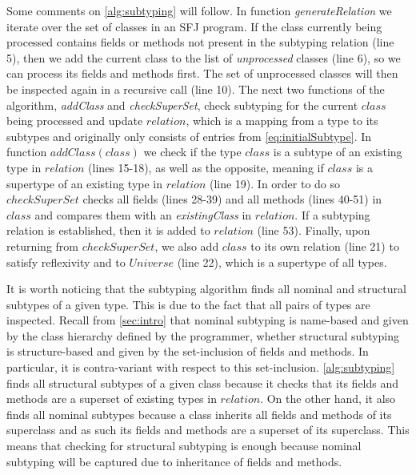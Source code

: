 \documentclass[runningheads]{llncs}
\begin{document}
Some comments on \autoref{alg:subtyping} will follow.
In function \textit{generateRelation} we iterate over the set of classes in an SFJ program.
If the class currently being processed contains fields or methods not present in the subtyping relation (line 5), then we add the current class to the list of \emph{unprocessed} classes (line 6), so we can process its fields and methods first.
The set of unprocessed classes will then be inspected again in a recursive call (line 10).
The next two functions of the algorithm, \emph{addClass} and \emph{checkSuperSet}, check subtyping for the current $class$ being processed and update $relation$, which is a mapping from a type to its subtypes and originally only consists of entries from \autoref{eq:initialSubtype}.
In function $addClass(class)$ we check if the type $class$ is a subtype of an existing type in $relation$ (lines 15-18), as well as the opposite, meaning if $class$ is a supertype of an existing type in $relation$ (line 19). In order to do so $checkSuperSet$ checks all fields (lines 28-39) and all methods (lines 40-51) in $class$ and compares them with an \emph{existingClass} in $relation$. If a subtyping relation is established, then it is added to $relation$ (line 53).
Finally, upon returning from $checkSuperSet$, we also add $class$ to its own relation (line 21) to satisfy reflexivity and to $Universe$ (line 22), which is a supertype of all types.

It is worth noticing that the subtyping algorithm finds all nominal and structural subtypes of a given type. This is due to the fact that all pairs of types are inspected.
Recall from \autoref{sec:intro} that nominal subtyping is name-based and given by the class hierarchy defined by the programmer, whether structural subtyping is structure-based and given by the set-inclusion of fields and methods. In particular, it is contra-variant with respect to this set-inclusion.
\autoref{alg:subtyping} finds all structural subtypes of a given class because it checks that its fields and methods are a superset of existing types in $relation$.
On the other hand, it also finds all nominal subtypes because a class inherits all fields and methods of its superclass and as such its fields and methods are a superset of its superclass.
This means that checking for structural subtyping is enough because nominal subtyping will be captured due to inheritance of fields and methods.
\end{document}
